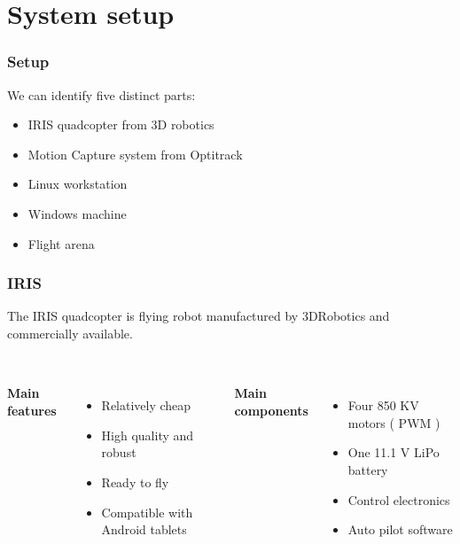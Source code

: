 \documentclass[xcolor=dvipsnames]{beamer}
\begin{document}

\section{System setup}
\begin{frame}
\tableofcontents[sectionstyle=show,square,currentsection]
\end{frame}


\begin{frame}
\frametitle{Setup}
We can identify five distinct parts:
\vspace{2em}
\begin{itemize}
\item  IRIS quadcopter from 3D robotics
\item  Motion Capture system from Optitrack
\item  Linux workstation
\item  Windows machine
\item  Flight arena
\end{itemize}
\end{frame}
\begin{frame}
\frametitle{IRIS}
The IRIS quadcopter is flying robot manufactured by 3DRobotics and commercially available. \\~\\ 

	\begin{columns}[t]
		\textbf{Main features}
		\begin{itemize}
			\item Relatively cheap
			\item High quality and robust 
			\item Ready to fly
			\item Compatible with Android tablets
		\end{itemize}
		\textbf{Main components}
		\begin{itemize}
			\item Four 850 KV motors ( PWM )
			\item One 11.1 V LiPo battery
			\item Control electronics
			\item Auto pilot software
		\end{itemize}
	\end{columns}
\end{frame}
\end{document}
